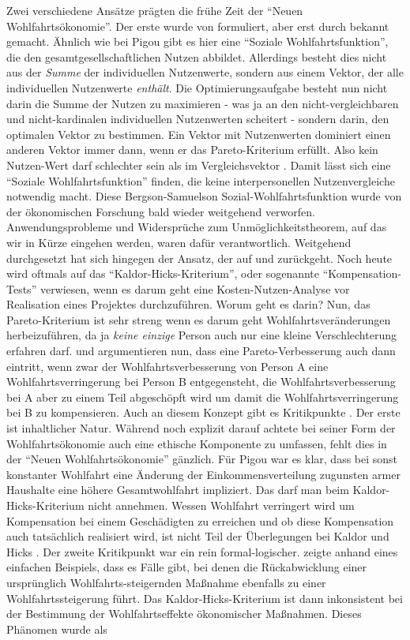 Zwei verschiedene Ansätze prägten die frühe Zeit der "`Neuen Wohlfahrtsökonomie"'.  Der erste wurde von \textcite{Bergson1938} formuliert, aber erst durch \textcite{Samuelson1947} bekannt gemacht. Ähnlich wie bei Pigou gibt es hier eine "`Soziale Wohlfahrtsfunktion"', die den gesamtgesellschaftlichen Nutzen abbildet. Allerdings besteht dies nicht aus der \textit{Summe} der individuellen Nutzenwerte, sondern aus einem Vektor, der alle individuellen Nutzenwerte \textit{enthält}. Die Optimierungsaufgabe besteht nun nicht darin die Summe der Nutzen zu maximieren - was ja an den nicht-vergleichbaren und nicht-kardinalen individuellen Nutzenwerten scheitert - sondern darin, den optimalen Vektor zu bestimmen. Ein Vektor mit Nutzenwerten dominiert einen anderen Vektor immer dann, wenn er das Pareto-Kriterium erfüllt. Also kein Nutzen-Wert darf schlechter sein als im Vergleichsvektor \parencite[S. 9]{Suzumura2016}. Damit lässt sich eine "`Soziale Wohlfahrtsfunktion"' finden, die keine interpersonellen Nutzenvergleiche notwendig macht. Diese Bergson-Samuelson Sozial-Wohlfahrtsfunktion wurde von der ökonomischen Forschung bald wieder weitgehend verworfen. Anwendungsprobleme und Widersprüche zum Unmöglichkeitstheorem, auf das wir in Kürze eingehen werden, waren dafür verantwortlich. Weitgehend durchgesetzt hat sich hingegen der Ansatz, der auf \textcite{Kaldor1939} und \textcite{Hicks1940} zurückgeht. Noch heute wird oftmals auf das "`Kaldor-Hicks-Kriterium"', oder sogenannte "`Kompensation-Tests"' verwiesen, wenn es darum geht eine Kosten-Nutzen-Analyse vor Realisation eines Projektes durchzuführen. Worum geht es darin? Nun, das Pareto-Kriterium ist sehr streng wenn es darum geht Wohlfahrtsveränderungen herbeizuführen, da ja \textit{keine einzige} Person auch nur eine kleine Verschlechterung erfahren darf. \textcite{Hicks1940} und \textcite{Kaldor1939} argumentieren nun, dass eine Pareto-Verbesserung auch dann eintritt, wenn zwar der Wohlfahrtsverbesserung von Person A eine Wohlfahrtsverringerung bei Person B entgegensteht, die Wohlfahrtsverbesserung bei A aber zu einem Teil abgeschöpft wird um damit die Wohlfahrtsverringerung bei B zu kompensieren. Auch an diesem Konzept gibt es Kritikpunkte \parencite{Baumol1946}. Der erste ist inhaltlicher Natur. Während \textcite{Pigou1920} noch explizit darauf achtete bei seiner Form der Wohlfahrtsökonomie auch eine ethische Komponente zu umfassen, fehlt dies in der "`Neuen Wohlfahrtsökonomie"' gänzlich. Für Pigou war es klar, dass bei sonst konstanter Wohlfahrt eine Änderung der Einkommensverteilung zugunsten armer Haushalte eine höhere Gesamtwohlfahrt impliziert. Das darf man beim Kaldor-Hicks-Kriterium nicht annehmen. Wessen Wohlfahrt verringert wird um Kompensation bei einem Geschädigten zu erreichen und ob diese Kompensation auch tatsächlich realisiert wird, ist nicht Teil der Überlegungen bei Kaldor und Hicks \parencite[S. 11]{Suzumura2016}. Der zweite Kritikpunkt war ein rein formal-logischer. \textcite{Scitovsky1941} zeigte anhand eines einfachen Beispiels, dass es Fälle gibt, bei denen die Rückabwicklung einer ursprünglich Wohlfahrts-steigernden Maßnahme ebenfalls zu einer Wohlfahrtssteigerung führt. Das Kaldor-Hicks-Kriterium ist dann inkonsistent bei der Bestimmung der Wohlfahrtseffekte ökonomischer Maßnahmen. Dieses Phänomen wurde als 